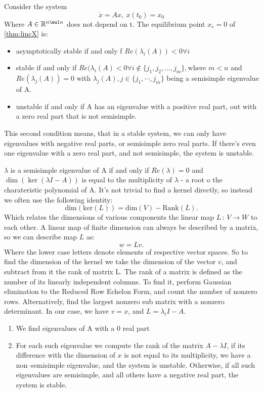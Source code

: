{
 Consider the system
 \begin{equation}
     \label{thm:lincX}
     \dot{x} = Ax, \: x(t_0) = x_0
 \end{equation}
 Where $A \in \mathbb{R}^{n\mul n}$ does not depend on t. The equilibrium point $x_e = 0$ of \ref{thm:lincX} is:
 \begin{itemize}
         \item asymptotically stable if and only f $Re(\lambda_i(A)) < 0 \forall i $ 
         \item stable if and only if $Re(\lambda_i(A) < 0 \forall i \not \in \{j_1, j_2, ..., j_m\}, \text{where } m < n $ and $Re(\lambda_j(A)) = 0$ with  $\lambda_j(A), j \in \{ j_1, \cdots ,j_m\}$ being a semisimple eigenvalue of A. 
         \item unstable if and only if A has an eigenvalue with a positive real part, out with a zero real part that is not semisimple.
         
 \end{itemize}
 \nt
 {
     This second condition means, that in a stable system, we can only have eigenvalues with negative real parts, or semisimple zero real parts. If there's even one eigenvalue with a zero real part, and not semisimple, the system is unstable. 
 }
 {
     $\lambda$ is a semisimple eigenvalue of A if and only if  $Re(\lambda) = 0$ and  $\dim (\ker (\lambda I - A))$ is equal to the multiplicity of  $\lambda$ - a root o the charateristic polynomial of A.
     It's not trivial to find a kernel directly, so instead we often use the following identity:
     \[
         \mathrm{dim}(\mathrm{ker}(L)) =  \mathrm{dim}(V) - \mathrm{Rank}(L)
     .\] 
     Which relates the dimensions of various components the linear map $L\,:\,V \longrightarrow W $ to each other.
 A linear map of finite dimension can always be described by a matrix, so we can describe map $L$ as:
  \[
 w=Lv
 .\] 
 Where the lower case letters denote elements of respective vector spaces.
 So to find the dimension of the kernel we take the dimension of the vector $v$, and subtract from it the rank of matrix L. The rank of a matrix is defined as the number of its linearly independent columns. To find it, perform Gaussian elimination to the Reduced Row Echelon Form, and count the number of nonzero rows. Alternatively, find the largest nonzero sub matrix with a nonzero determinant. In our case, we have $v = x$, and  $L = \lambda_i I - A$.\\
\begin{enumerate}
    \item We find eigenvalues of A with a 0 real part
    \item For each such eigenvalue we compute the rank of the matrix $A-\lambda I$, if its difference with the dimension of $x$ is not equal to its multiplicity, we have a non--semisimple eigenvalue, and the system is unstable. Otherwise, if all such eigenvalues are semisimple, and all others have a negative real part, the system is stable.
\end{enumerate}
 }

 \ex{}
 {}
}


